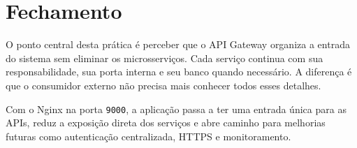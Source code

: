 \documentclass[12pt,a4paper]{article}
\begin{document}
\section{Fechamento}

O ponto central desta pr\'atica \'e perceber que o API Gateway organiza a entrada do sistema sem eliminar os microsservi\c{c}os. Cada servi\c{c}o continua com sua responsabilidade, sua porta interna e seu banco quando necess\'ario. A diferen\c{c}a \'e que o consumidor externo n\~ao precisa mais conhecer todos esses detalhes.

Com o Nginx na porta \texttt{9000}, a aplica\c{c}\~ao passa a ter uma entrada \'unica para as APIs, reduz a exposi\c{c}\~ao direta dos servi\c{c}os e abre caminho para melhorias futuras como autentica\c{c}\~ao centralizada, HTTPS e monitoramento.
\end{document}

